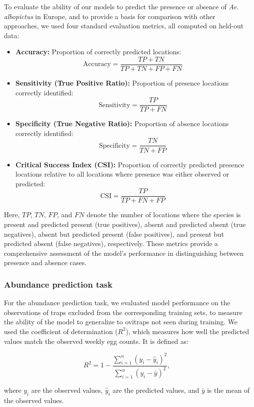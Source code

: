 \documentclass[preprint,12pt]{elsarticle}
\begin{document}
To evaluate the ability of our models to predict the presence or absence of \textit{Ae. albopictus} in Europe, and to provide a basis for comparison with other approaches, we used four standard evaluation metrics, all computed on held-out data:
\begin{itemize}
    \item \textbf{Accuracy:} Proportion of correctly predicted locations:
    \[
    \mathrm{Accuracy} = \frac{TP + TN}{TP + TN + FP + FN}
    \]

    \item \textbf{Sensitivity (True Positive Ratio):} Proportion of presence locations correctly identified:
    \[
    \mathrm{Sensitivity} = \frac{TP}{TP + FN}
    \]

    \item \textbf{Specificity (True Negative Ratio):} Proportion of absence locations correctly identified:
    \[
    \mathrm{Specificity} = \frac{TN}{TN + FP}
    \]
    \item \textbf{Critical Success Index (CSI):} Proportion of correctly predicted presence locations relative to all locations where presence was either observed or predicted:
    \[
        \mathrm{CSI} = \frac{TP}{TP + FN + FP}
    \]
\end{itemize}

Here, \( TP \), \( TN \), \( FP \), and \( FN \) denote the number of locations where the species is present and predicted present (true positives), absent and predicted absent (true negatives), absent but predicted present (false positives), and present but predicted absent (false negatives), respectively.
These metrics provide a comprehensive assessment of the model’s performance in distinguishing between presence and absence cases.

\subsubsection{Abundance prediction task}
For the abundance prediction task, we evaluated model performance on the observations of traps excluded from the corresponding training sets, to measure the ability of the model to generalize to ovitraps not seen during training. We used the coefficient of determination ($R^2$), which measures how well the predicted values match the observed weekly egg counts. It is defined as:

\[
R^2 = 1 - \frac{\sum_{i=1}^{n} (y_i - \hat{y}_i)^2}{\sum_{i=1}^{n} (y_i - \bar{y})^2},
\]

where $y_i$ are the observed values, $\hat{y}_i$ are the predicted values, and $\bar{y}$ is the mean of the observed values.
\end{document}
